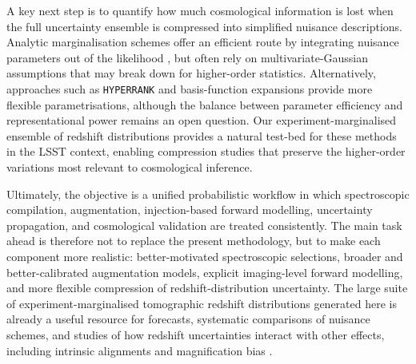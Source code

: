 A key next step is to quantify how much cosmological information is lost when the full uncertainty ensemble is compressed into simplified nuisance descriptions. Analytic marginalisation schemes offer an efficient route by integrating nuisance parameters out of the likelihood \citep{2020JCAP...10..056H, 2023MNRAS.522.5037R, 2023OJAp....6E..23H, 2024MNRAS.530.4412R}, but often rely on multivariate-Gaussian assumptions \citep{2010MNRAS.408..865T} that may break down for higher-order statistics. Alternatively, approaches such as \texttt{HYPERRANK} \citep{2022MNRAS.511.2170C} and basis-function expansions \citep{2021A&A...650A.148S} provide more flexible parametrisations, although the balance between parameter efficiency and representational power remains an open question. Our experiment-marginalised ensemble of redshift distributions provides a natural test-bed for these methods in the LSST context, enabling compression studies that preserve the higher-order variations most relevant to cosmological inference.

Ultimately, the objective is a unified probabilistic workflow in which spectroscopic compilation, augmentation, injection-based forward modelling, uncertainty propagation, and cosmological validation are treated consistently. The main task ahead is therefore not to replace the present methodology, but to make each component more realistic: better-motivated spectroscopic selections, broader and better-calibrated augmentation models, explicit imaging-level forward modelling, and more flexible compression of redshift-distribution uncertainty. The large suite of experiment-marginalised tomographic redshift distributions generated here is already a useful resource for forecasts, systematic comparisons of nuisance schemes, and studies of how redshift uncertainties interact with other effects, including intrinsic alignments \citep{2024PhRvD.109h3528L} and magnification bias \citep{2022MNRAS.513.1210M}.
